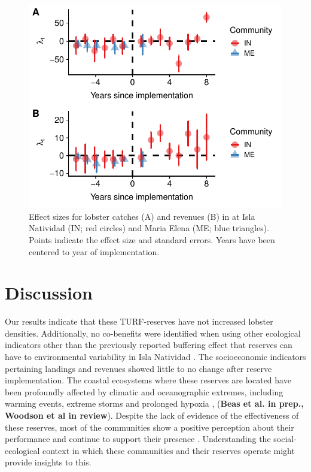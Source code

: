\documentclass{frontiersSCNS}
\theoremstyle{definition}
\theoremstyle{definition}
\theoremstyle{definition}
\theoremstyle{remark}
\begin{document}
\begin{figure}
\centering
\includegraphics{Villasenor-Derbez_files/figure-latex/unnamed-chunk-7-1.pdf}
\caption{\label{fig:unnamed-chunk-7}\label{fig:lobsters}Effect sizes for
lobster catches (A) and revenues (B) in at Isla Natividad (IN; red
circles) and Maria Elena (ME; blue triangles). Points indicate the
effect size and standard errors. Years have been centered to year of
implementation.}
\end{figure}

\section{Discussion}\label{discussion}

Our results indicate that these TURF-reserves have not increased lobster
densities. Additionally, no co-benefits were identified when using other
ecological indicators other than the previously reported buffering
effect that reserves can have to environmental variability in Isla
Natividad \citep{micheli_2012-EU}. The socioeconomic indicators
pertaining landings and revenues showed little to no change after
reserve implementation. The coastal ecosystems where these reserves are
located have been profoundly affected by climatic and oceanographic
extremes, including warming events, extreme storms and prolonged hypoxia
\citep{micheli_2012-EU}, (\textbf{Beas et al. in prep., Woodson et al in
review}). Despite the lack of evidence of the effectiveness of these
reserves, most of the communities show a positive perception about their
performance and continue to support their presence \citep{ayer_2018}.
Understanding the social-ecological context in which these communities
and their reserves operate might provide insights to this.
\end{document}
